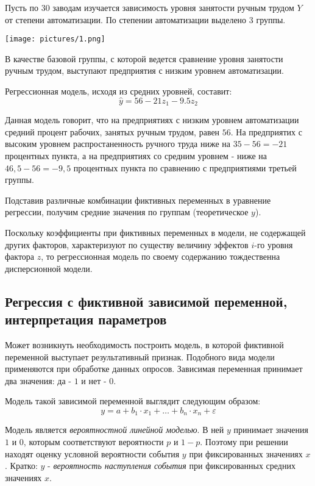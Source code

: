\documentclass[aps,%
12pt,%
final,%
oneside,
onecolumn,%
musixtex, %
superscriptaddress,%
centertags]{article} %
\theoremstyle{plain}
\theoremstyle{definition}
\theoremstyle{remark}
\begin{document}
Пусть по $30$ заводам изучается зависимость уровня занятости ручным трудом $Y$ от степени автоматизации. По степении автоматизации выделено 3 группы.

\begin{center}
	\texttt{[image: pictures/1.png]}
\end{center}

В качестве базовой группы, с которой ведется сравнение уровня занятости ручным трудом, выступают предприятия с низким уровнем автоматизации.

Регрессионная модель, исходя из средних уровней, составит:
$$\hat{y} = 56 - 21z_1 - 9.5z_2$$

Данная модель говорит, что на предприятиях с низким уровнем автоматизации средний процент рабочих, занятых ручным трудом, равен $56$. На предприятих с высоким уровнем распростаненность ручного труда ниже на $35-56 = -21$ процентных пункта, а на предприятиях со средним уровнем - ниже на $46,5 - 56 = -9,5$ процентных пункта по сравнению с предприятиями третьей группы.

Подставив различные комбинации фиктивных переменных в уравнение регрессии, получим средние значения по группам (теоретическое $y$).

Поскольку коэффициенты при фиктивных переменных в модели, не содержащей других факторов, характеризуют по существу величину эффектов $i$-го уровня фактора $z$, то регрессионная модель по своему содержанию тождественна дисперсионной модели.

\newpage
\subsection{Регрессия с фиктивной зависимой переменной, интерпретация параметров}

Может возникнуть необходимость построить модель, в которой фиктивной переменной выступает результативный признак. Подобного вида модели применяются при обработке данных опросов. Зависимая переменная принимает два значения: да - $1$ и нет - $0$.

Модель такой зависимой переменной выглядит следующим образом:
$$y = a + b_1 \cdot x_1 + \ldots + b_n \cdot x_n + \varepsilon$$

Модель является \textit{вероятностной линейной моделью}. В ней $y$ принимает значения $1$ и $0$, которым соответствуют вероятности $p$ и $1-p$. Поэтому при решении находят оценку условной вероятности события $y$ при фиксированных значениях $x$. Кратко: $y$ - \textit{вероятность наступления события} при фиксированных средних значениях $x$.
\end{document}

